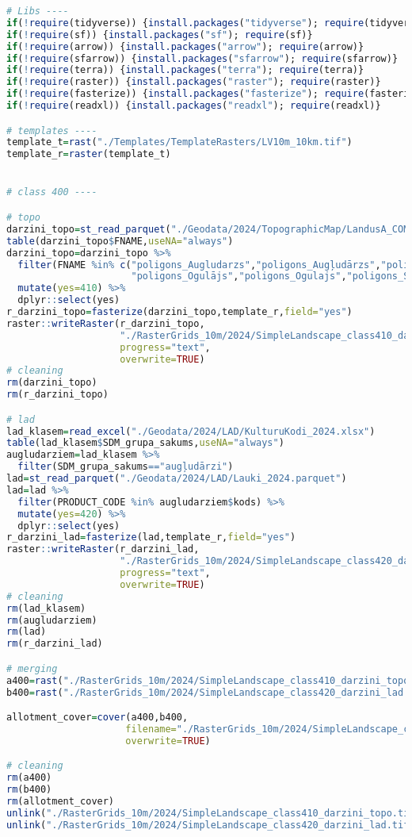 \documentclass[
]{book}
\begin{document}
\begin{lstlisting}[language=R]
# Libs ----
if(!require(tidyverse)) {install.packages("tidyverse"); require(tidyverse)}
if(!require(sf)) {install.packages("sf"); require(sf)}
if(!require(arrow)) {install.packages("arrow"); require(arrow)}
if(!require(sfarrow)) {install.packages("sfarrow"); require(sfarrow)}
if(!require(terra)) {install.packages("terra"); require(terra)}
if(!require(raster)) {install.packages("raster"); require(raster)}
if(!require(fasterize)) {install.packages("fasterize"); require(fasterize)}
if(!require(readxl)) {install.packages("readxl"); require(readxl)}

# templates ----
template_t=rast("./Templates/TemplateRasters/LV10m_10km.tif")
template_r=raster(template_t)


# class 400 ----

# topo
darzini_topo=st_read_parquet("./Geodata/2024/TopographicMap/LandusA_COMB.parquet")
table(darzini_topo$FNAME,useNA="always")
darzini_topo=darzini_topo %>% 
  filter(FNAME %in% c("poligons_Augludarzs","poligons_Augļudārzs","poligons_Sakņudārzs",
                      "poligons_Ogulājs","poligons_Ogulajs","poligons_Saknudarzs")) %>% 
  mutate(yes=410) %>% 
  dplyr::select(yes)
r_darzini_topo=fasterize(darzini_topo,template_r,field="yes")
raster::writeRaster(r_darzini_topo,
                    "./RasterGrids_10m/2024/SimpleLandscape_class410_darzini_topo.tif",
                    progress="text",
                    overwrite=TRUE)
# cleaning
rm(darzini_topo)
rm(r_darzini_topo)

# lad
lad_klasem=read_excel("./Geodata/2024/LAD/KulturuKodi_2024.xlsx")
table(lad_klasem$SDM_grupa_sakums,useNA="always")
augludarziem=lad_klasem %>% 
  filter(SDM_grupa_sakums=="augļudārzi")
lad=st_read_parquet("./Geodata/2024/LAD/Lauki_2024.parquet")
lad=lad %>% 
  filter(PRODUCT_CODE %in% augludarziem$kods) %>% 
  mutate(yes=420) %>% 
  dplyr::select(yes)
r_darzini_lad=fasterize(lad,template_r,field="yes")
raster::writeRaster(r_darzini_lad,
                    "./RasterGrids_10m/2024/SimpleLandscape_class420_darzini_lad.tif",
                    progress="text",
                    overwrite=TRUE)
# cleaning
rm(lad_klasem)
rm(augludarziem)
rm(lad)
rm(r_darzini_lad)

# merging
a400=rast("./RasterGrids_10m/2024/SimpleLandscape_class410_darzini_topo.tif")
b400=rast("./RasterGrids_10m/2024/SimpleLandscape_class420_darzini_lad.tif")

allotment_cover=cover(a400,b400,
                     filename="./RasterGrids_10m/2024/SimpleLandscape_class400_varnicas_premask.tif",
                     overwrite=TRUE)

# cleaning
rm(a400)
rm(b400)
rm(allotment_cover)
unlink("./RasterGrids_10m/2024/SimpleLandscape_class410_darzini_topo.tif")
unlink("./RasterGrids_10m/2024/SimpleLandscape_class420_darzini_lad.tif")
\end{lstlisting}
\end{document}
